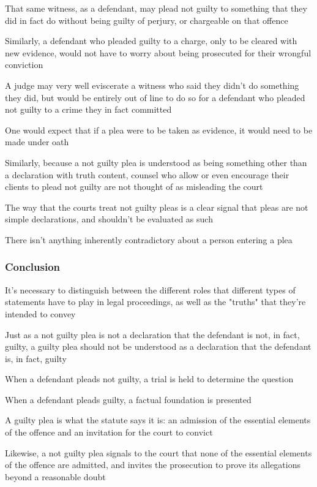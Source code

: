 That same witness, as a defendant, may plead not guilty to something that they did in fact do without being guilty of perjury, or chargeable on that offence

Similarly, a defendant who pleaded guilty to a charge, only to be cleared with new evidence, would not have to worry about being prosecuted for their wrongful conviction

A judge may very well eviscerate a witness who said they didn't do something they did, but would be entirely out of line to do so for a defendant who pleaded not guilty to a crime they in fact committed

One would expect that if a plea were to be taken as evidence, it would need to be made under oath

Similarly, because a not guilty plea is understood as being something other than a declaration with truth content, counsel who allow or even encourage their clients to plead not guilty are not thought of as misleading the court

The way that the courts treat not guilty pleas is a clear signal that pleas are not simple declarations, and shouldn't be evaluated as such

There isn't anything inherently contradictory about a person entering a plea

\subsubsection{Conclusion}

It's necessary to distinguish between the different roles that different types of statements have to play in legal proceedings, as well as the "truths" that they're intended to convey

Just as a not guilty plea is not a declaration that the defendant is not, in fact, guilty, a guilty plea should not be understood as a declaration that the defendant is, in fact, guilty

When a defendant pleads not guilty, a trial is held to determine the question

When a defendant pleads guilty, a factual foundation is presented

A guilty plea is what the statute says it is: an admission of the essential elements of the offence and an invitation for the court to convict

Likewise, a not guilty plea signals to the court that none of the essential elements of the offence are admitted, and invites the prosecution to prove its allegations beyond a reasonable doubt


